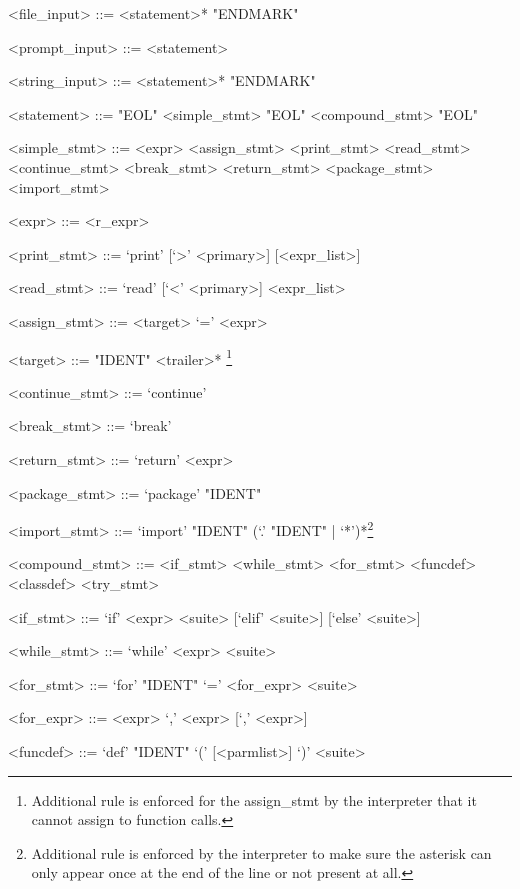 \documentclass[10pt,a4paper]{article}
\begin{document}
\setlength{\grammarparsep}{10pt plus 1pt minus 1pt} %
\setlength{\grammarindent}{12em} %
\begin{grammar}


<file_input> ::= <statement>* "ENDMARK"

<prompt_input> ::= <statement>

<string_input> ::= <statement>* "ENDMARK"

<statement> ::= "EOL" 
    \alt <simple_stmt> "EOL"
    \alt <compound_stmt> "EOL"


<simple_stmt> ::= <expr>
	\alt <assign_stmt>                    
	\alt <print_stmt>
	\alt <read_stmt>
	\alt <continue_stmt>
	\alt <break_stmt>
	\alt <return_stmt>
	\alt <package_stmt>
	\alt <import_stmt>

<expr> ::= <r_expr>
	
<print_stmt> ::= `print' [`>' <primary>] [<expr_list>]

<read_stmt> ::= `read' [`<' <primary>] <expr_list>

<assign_stmt> ::= <target> `=' <expr>

<target> ::= "IDENT" <trailer>* \footnote{Additional rule is enforced for the
assign_stmt by the interpreter that it cannot assign to function calls.}

<continue_stmt> ::= `continue'

<break_stmt> ::= `break'

<return_stmt> ::= `return' <expr>

<package_stmt> ::= `package' "IDENT"

<import_stmt> ::= `import' "IDENT" (`.' "IDENT" | `*')*\footnote{
Additional rule is enforced by the interpreter to make sure the asterisk
can only appear once at the end of the line or not present at all.}

<compound_stmt> ::= <if_stmt>
	\alt <while_stmt>
	\alt <for_stmt>
	\alt <funcdef>
    \alt <classdef>
    \alt <try_stmt>

<if_stmt> ::= `if' <expr> <suite> [`elif' <suite>] [`else' <suite>]
              
<while_stmt> ::= `while' <expr> <suite>

<for_stmt> ::= `for' "IDENT" `=' <for_expr> <suite>

<for_expr> ::= <expr> `,' <expr> [`,' <expr>]

<funcdef> ::= `def' "IDENT" `(' [<parmlist>] `)' <suite>


\end{grammar}
\end{document}
